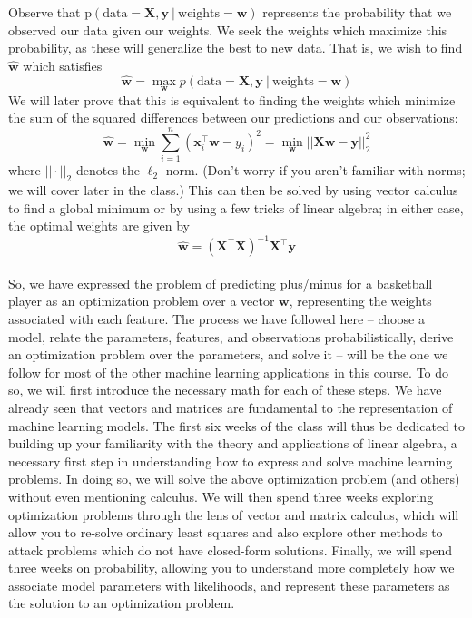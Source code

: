 \documentclass{article}
\begin{document}
\noindent
Observe that $\text{p}(\text{data} = \mathbf{X}, \mathbf{y}\ |\ \text{weights} = \mathbf{w})$ represents the probability that we observed our data given our weights. We seek the weights which maximize this probability, as these will generalize the best to new data. That is, we wish to find $\hat{\mathbf{w}}$ which satisfies $$\hat{\mathbf{w}} = \max\limits_{\mathbf{w}} p(\text{data} = \mathbf{X}, \mathbf{y}\ |\ \text{weights} = \mathbf{w})$$ We will later prove that this is equivalent to finding the weights which minimize the sum of the squared differences between our predictions and our observations: $$\hat{\mathbf{w}} = \min\limits_{\mathbf{w}} \sum\limits_{i=1}^{n} (\mathbf{x}_i^{\top}\mathbf{w} - y_i)^2 = \min\limits_{\mathbf{w}}||\mathbf{X}\mathbf{w} - \mathbf{y}||_2^2$$ where $||\cdot||_2$ denotes the $\ell_2$-norm. (Don't worry if you aren't familiar with norms; we will cover later in the class.) This can then be solved by using vector calculus to find a global minimum or by using a few tricks of linear algebra; in either case, the optimal weights are given by $$\hat{\mathbf{w}} = (\mathbf{X}^{\top}\mathbf{X})^{-1}\mathbf{X}^{\top}\mathbf{y}$$\\
\noindent
So, we have expressed the problem of predicting plus/minus for a basketball player as an optimization problem over a vector $\mathbf{w}$, representing the weights associated with each feature. The process we have followed here -- choose a model, relate the parameters, features, and observations probabilistically, derive an optimization problem over the parameters, and solve it -- will be the one we follow for most of the other machine learning applications in this course. To do so, we will first introduce the necessary math for each of these steps. We have already seen that vectors and matrices are fundamental to the representation of machine learning models. The first six weeks of the class will thus be dedicated to building up your familiarity with the theory and applications of linear algebra, a necessary first step in understanding how to express and solve machine learning problems. In doing so, we will solve the above optimization problem (and others) without even mentioning calculus. We will then spend three weeks exploring optimization problems through the lens of vector and matrix calculus, which will allow you to re-solve ordinary least squares and also explore other methods to attack problems which do not have closed-form solutions. Finally, we will spend three weeks on probability, allowing you to understand more completely how we associate model parameters with likelihoods, and represent these parameters as the solution to an optimization problem.
\clearpage
\end{document}
